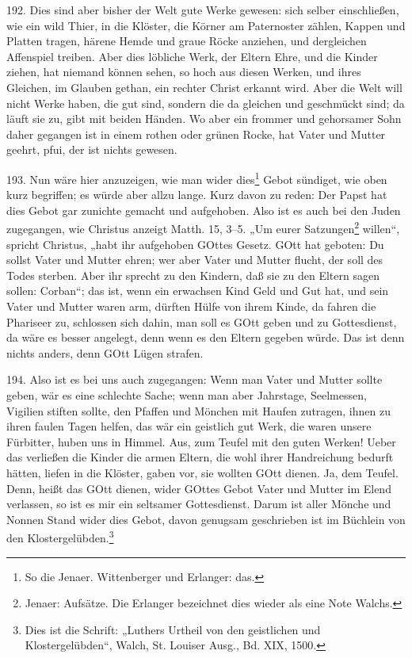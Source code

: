 192. Dies sind aber bisher der Welt gute Werke gewesen: sich selber einschließen, wie ein wild Thier, in die Klöster, die Körner am Paternoster zählen, Kappen und Platten tragen, härene Hemde und graue Röcke anziehen, und dergleichen Affenspiel treiben. Aber dies löbliche Werk, der Eltern Ehre, und die Kinder ziehen, hat niemand können sehen, so hoch aus diesen Werken, und ihres Gleichen, im Glauben gethan, ein rechter Christ erkannt wird. Aber die Welt will nicht Werke haben, die gut sind, sondern die da gleichen und geschmückt sind; da läuft sie zu, gibt mit beiden Händen. Wo aber ein frommer und gehorsamer Sohn daher gegangen ist in einem rothen oder grünen Rocke, hat Vater und Mutter geehrt, pfui, der ist nichts gewesen.

193. Nun wäre hier anzuzeigen, wie man wider dies\footnote{So die Jenaer. Wittenberger und Erlanger: das.} Gebot sündiget, wie oben kurz begriffen; es würde aber allzu lange. Kurz davon zu reden: Der Papst hat dies Gebot gar zunichte gemacht und aufgehoben. Also ist es auch bei den Juden zugegangen, wie Christus anzeigt Matth. 15, 3–5. „Um eurer Satzungen\footnote{Jenaer: Aufsätze. Die Erlanger bezeichnet dies wieder als eine Note Walchs.} willen“, spricht Christus, „habt ihr aufgehoben GOttes Gesetz. GOtt hat geboten: Du sollst Vater und Mutter ehren; wer aber Vater und Mutter flucht, der soll des Todes sterben. Aber ihr sprecht zu den Kindern, daß sie zu den Eltern sagen sollen: Corban“; das ist, wenn ein erwachsen Kind Geld und Gut hat, und sein Vater und Mutter waren arm, dürften Hülfe von ihrem Kinde, da fahren die Phariseer zu, schlossen sich dahin, man soll es GOtt geben und zu Gottesdienst, da wäre es besser angelegt, denn wenn es den Eltern gegeben würde. Das ist denn nichts anders, denn GOtt Lügen strafen.

194. Also ist es bei uns auch zugegangen: Wenn man Vater und Mutter sollte geben, wär es eine schlechte Sache; wenn man aber Jahrstage, Seelmessen, Vigilien stiften sollte, den Pfaffen und Mönchen mit Haufen zutragen, ihnen zu ihren faulen Tagen helfen, das wär ein geistlich gut Werk, die waren unsere Fürbitter, huben uns in Himmel. Aus, zum Teufel mit den guten Werken! Ueber das verließen die Kinder die armen Eltern, die wohl ihrer Handreichung bedurft hätten, liefen in die Klöster, gaben vor, sie wollten GOtt dienen. Ja, dem Teufel. Denn,
heißt das GOtt dienen, wider GOttes Gebot Vater und Mutter im Elend verlassen, so ist es mir ein seltsamer Gottesdienst. Darum ist aller Mönche und Nonnen Stand wider dies Gebot, davon genugsam geschrieben ist im Büchlein von den Klostergelübden.\footnote{Dies ist die Schrift: „Luthers Urtheil von den geistlichen und Klostergelübden“, Walch, St. Louiser Ausg., Bd. XIX, 1500.}

